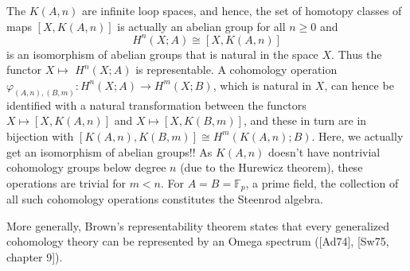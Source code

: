 The $K(A, n)$ are infinite loop spaces, and hence, the set of homotopy classes of maps $[X, K(A, n)]$ is actually an abelian group for all $n \geq 0$ and
$$
H^n(X ; A) \cong[X, K(A, n)]
$$
is an isomorphism of abelian groups that is natural in the space $X$. Thus the functor $X \mapsto$ $H^n(X ; A)$ is representable. A cohomology operation $\varphi_{(A, n),(B, m)}: H^n(X ; A) \rightarrow H^m(X ; B)$, which is natural in $X$, can hence be identified with a natural transformation between the functors $X \mapsto[X, K(A, n)]$ and $X \mapsto[X, K(B, m)]$, and these in turn are in bijection with $[K(A, n), K(B, m)] \cong H^m(K(A, n) ; B)$. Here, we actually get an isomorphism of abelian groups!! As $K(A, n)$ doesn't have nontrivial cohomology groups below degree $n$ (due to the Hurewicz theorem), these operations are trivial for $m<n$. For $A=B=\mathbb{F}_p$, a prime field, the collection of all such cohomology operations constitutes the Steenrod algebra.

More generally, Brown's representability theorem states that every generalized cohomology theory can be represented by an Omega spectrum ([Ad74], [Sw75, chapter 9]).